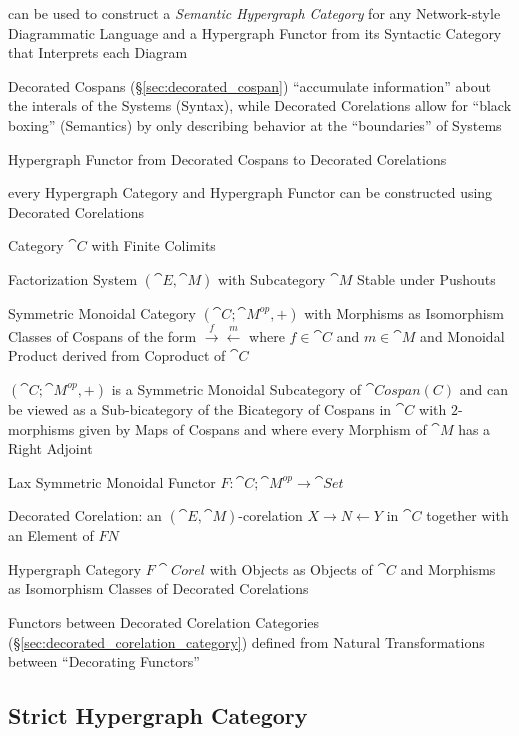 can be used to construct a \emph{Semantic Hypergraph Category} for any
Network-style Diagrammatic Language and a Hypergraph Functor from its
Syntactic Category that Interprets each Diagram

Decorated Cospans (\S\ref{sec:decorated_cospan}) ``accumulate
information'' about the interals of the Systems (Syntax), while
Decorated Corelations allow for ``black boxing'' (Semantics) by only
describing behavior at the ``boundaries'' of Systems

Hypergraph Functor from Decorated Cospans to Decorated Corelations

every Hypergraph Category and Hypergraph Functor can be constructed
using Decorated Corelations

Category $\cat{C}$ with Finite Colimits

Factorization System $(\cat{E},\cat{M})$ with Subcategory $\cat{M}$
Stable under Pushouts

Symmetric Monoidal Category $(\cat{C};\cat{M}^{op}, +)$ with Morphisms
as Isomorphism Classes of Cospans of the form
$\xrightarrow{f}\xleftarrow{m}$ where $f \in \cat{C}$ and $m \in
\cat{M}$ and Monoidal Product derived from Coproduct of $\cat{C}$

$(\cat{C};\cat{M}^{op}, +)$ is a Symmetric Monoidal Subcategory of
$\cat{Cospan(C)}$ and can be viewed as a Sub-bicategory of the
Bicategory of Cospans in $\cat{C}$ with $2$-morphisms given by Maps of
Cospans and where every Morphism of $\cat{M}$ has a Right Adjoint

Lax Symmetric Monoidal Functor $F : \cat{C};\cat{M}^{op} \rightarrow
\cat{Set}$

Decorated Corelation: an $(\cat{E},\cat{M})$-corelation $X \rightarrow
N \leftarrow Y$ in $\cat{C}$ together with an Element of $F N$ %

Hypergraph Category $F\cat{Corel}$ with Objects as Objects of
$\cat{C}$ and Morphisms as Isomorphism Classes of Decorated
Corelations

Functors between Decorated Corelation Categories
(\S\ref{sec:decorated_corelation_category}) defined from Natural
Transformations between ``Decorating Functors'' %



\subsection{Strict Hypergraph Category}
\label{sec:strict_hypergraph_category}

